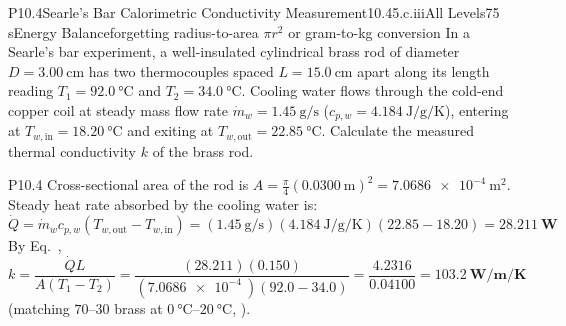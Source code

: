 \begin{problem}{P10.4}{Searle's Bar Calorimetric Conductivity Measurement}{10.4}{5.c.iii}{All Levels}{75 s}{Energy Balance}{forgetting radius-to-area $\pi r^2$ or gram-to-kg conversion}
In a Searle's bar experiment, a well-insulated cylindrical brass rod of diameter $D = \SI{3.00}{\centi\meter}$ has two thermocouples spaced $L = \SI{15.0}{\centi\meter}$ apart along its length reading $T_1 = \SI{92.0}{\celsius}$ and $T_2 = \SI{34.0}{\celsius}$. Cooling water flows through the cold-end copper coil at steady mass flow rate $\dot{m}_w = \SI{1.45}{\gram\per\second}$ ($c_{p,w} = \SI{4.184}{\joule\per\gram\per\kelvin}$), entering at $T_{w,\mathrm{in}} = \SI{18.20}{\celsius}$ and exiting at $T_{w,\mathrm{out}} = \SI{22.85}{\celsius}$. Calculate the measured thermal conductivity $k$ of the brass rod.
\end{problem}
\begin{solution}{P10.4}
Cross-sectional area of the rod is $A = \frac{\pi}{4}(\SI{0.0300}{\meter})^2 = \SI{7.0686e-4}{\square\meter}$. Steady heat rate absorbed by the cooling water is:
\[
  \dot{Q} = \dot{m}_w c_{p,w}\left(T_{w,\mathrm{out}} - T_{w,\mathrm{in}}\right) = (\SI{1.45}{\gram\per\second})(\SI{4.184}{\joule\per\gram\per\kelvin})(22.85 - 18.20) = \mathbf{\SI{28.211}{\watt}}
\]
By Eq.~, $k = \dfrac{\dot{Q} L}{A(T_1 - T_2)} = \dfrac{(28.211)(0.150)}{(\SI{7.0686e-4}{})(92.0 - 34.0)} = \dfrac{4.2316}{0.04100} = \mathbf{\SI{103.2}{\watt\per\meter\per\kelvin}}$ (matching $70$--$30$ brass at $\SI{0}{\celsius}$--$\SI{20}{\celsius}$, ).
\end{solution}

